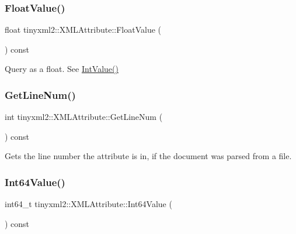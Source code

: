 \subsubsection{\texorpdfstring{Float\+Value()}{FloatValue()}}
{\footnotesize\ttfamily float tinyxml2\+::\+X\+M\+L\+Attribute\+::\+Float\+Value (\begin{DoxyParamCaption}{ }\end{DoxyParamCaption}) const\hspace{0.3cm}{\ttfamily [inline]}}



Query as a float. See \hyperlink{classtinyxml2_1_1_x_m_l_attribute_adfa2433f0fdafd5c3880936de9affa80}{Int\+Value()} 

\mbox{\label{classtinyxml2_1_1_x_m_l_attribute_a02d5ea924586e35f9c13857d1671b765}} 
\subsubsection{\texorpdfstring{Get\+Line\+Num()}{GetLineNum()}}
{\footnotesize\ttfamily int tinyxml2\+::\+X\+M\+L\+Attribute\+::\+Get\+Line\+Num (\begin{DoxyParamCaption}{ }\end{DoxyParamCaption}) const\hspace{0.3cm}{\ttfamily [inline]}}



Gets the line number the attribute is in, if the document was parsed from a file. 

\mbox{\label{classtinyxml2_1_1_x_m_l_attribute_a8762ed54f147c5744ada55c3d04d27f2}} 
\subsubsection{\texorpdfstring{Int64\+Value()}{Int64Value()}}
{\footnotesize\ttfamily int64\+\_\+t tinyxml2\+::\+X\+M\+L\+Attribute\+::\+Int64\+Value (\begin{DoxyParamCaption}{ }\end{DoxyParamCaption}) const\hspace{0.3cm}{\ttfamily [inline]}}

